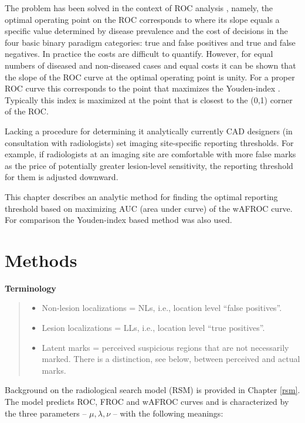 \documentclass[
]{book}
\providecommand{\tightlist}{%
  \setlength{\itemsep}{0pt}\setlength{\parskip}{0pt}}
\begin{document}
The problem has been solved in the context of ROC analysis \citep{metz1978rocmethodology}, namely, the optimal operating point on the ROC corresponds to where its slope equals a specific value determined by disease prevalence and the cost of decisions in the four basic binary paradigm categories: true and false positives and true and false negatives. In practice the costs are difficult to quantify. However, for equal numbers of diseased and non-diseased cases and equal costs it can be shown that the slope of the ROC curve at the optimal operating point is unity. For a proper ROC curve this corresponds to the point that maximizes the Youden-index \citep{youden1950index}. Typically this index is maximized at the point that is closest to the (0,1) corner of the ROC.

Lacking a procedure for determining it analytically currently CAD designers (in consultation with radiologists) set imaging site-specific reporting thresholds. For example, if radiologists at an imaging site are comfortable with more false marks as the price of potentially greater lesion-level sensitivity, the reporting threshold for them is adjusted downward.

This chapter describes an analytic method for finding the optimal reporting threshold based on maximizing AUC (area under curve) of the wAFROC curve. For comparison the Youden-index based method was also used.

\hypertarget{optim-op-point-methods}{%
\section{Methods}\label{optim-op-point-methods}}

\textbf{Terminology}

\begin{quote}
\begin{itemize}
\tightlist
\item
  Non-lesion localizations = NLs, i.e., location level ``false positives''.
\item
  Lesion localizations = LLs, i.e., location level ``true positives''.
\item
  Latent marks = perceived suspicious regions that are not necessarily marked. There is a distinction, see below, between perceived and actual marks.
\end{itemize}
\end{quote}

Background on the radiological search model (RSM) is provided in Chapter \ref{rsm}. The model predicts ROC, FROC and wAFROC curves and is characterized by the three parameters -- \(\mu, \lambda, \nu\) -- with the following meanings:
\end{document}
